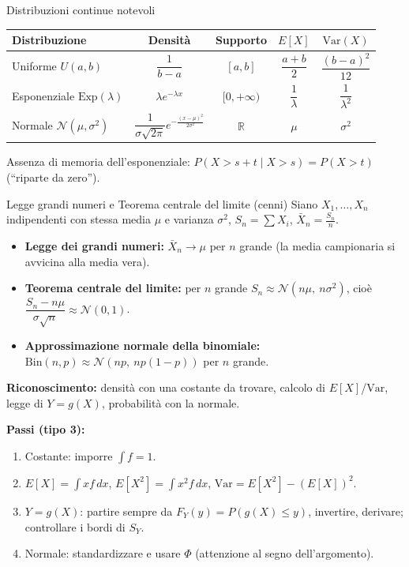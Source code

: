 \documentclass[11pt]{article}
\begin{document}
\begin{concetto}[barGreen]{Distribuzioni continue notevoli}
\begin{center}
\begin{tabular}{lcccc}
\hline
Distribuzione & Densit\`a & Supporto & $E[X]$ & $\mathrm{Var}(X)$ \\
\hline
Uniforme $U(a,b)$ & $\dfrac{1}{b-a}$ & $[a,b]$ & $\dfrac{a+b}{2}$ & $\dfrac{(b-a)^2}{12}$ \\[10pt]
Esponenziale $\mathrm{Exp}(\lambda)$ & $\lambda e^{-\lambda x}$ & $[0,+\infty)$ & $\dfrac{1}{\lambda}$ & $\dfrac{1}{\lambda^2}$ \\[10pt]
Normale $\mathcal{N}(\mu,\sigma^2)$ & $\dfrac{1}{\sigma\sqrt{2\pi}}e^{-\frac{(x-\mu)^2}{2\sigma^2}}$ & $\mathbb{R}$ & $\mu$ & $\sigma^2$ \\[6pt]
\hline
\end{tabular}
\end{center}
\end{concetto}

\begin{attenzione}
Assenza di memoria dell'esponenziale: $P(X>s+t \mid X>s) = P(X>t)$ (``riparte da zero'').
\end{attenzione}

\begin{concetto}[barGreen]{Legge grandi numeri e Teorema centrale del limite (cenni)}
Siano $X_1,\dots,X_n$ indipendenti con stessa media $\mu$ e varianza $\sigma^2$, $S_n=\sum X_i$, $\bar X_n=\frac{S_n}{n}$.
\begin{itemize}[leftmargin=1.2em,itemsep=2pt,topsep=2pt]
\item \textbf{Legge dei grandi numeri:} $\bar X_n \to \mu$ per $n$ grande (la media campionaria si avvicina alla media vera).
\item \textbf{Teorema centrale del limite:} per $n$ grande $S_n \approx \mathcal{N}(n\mu,\ n\sigma^2)$, cio\`e $\dfrac{S_n-n\mu}{\sigma\sqrt{n}} \approx \mathcal{N}(0,1)$.
\item \textbf{Approssimazione normale della binomiale:} $\mathrm{Bin}(n,p)\approx\mathcal{N}(np,\ np(1-p))$ per $n$ grande.
\end{itemize}
\end{concetto}

\begin{trucco}
\textbf{Riconoscimento:} densit\`a con una costante da trovare, calcolo di $E[X]$/$\mathrm{Var}$, legge di $Y=g(X)$, probabilit\`a con la normale.

\textbf{Passi (tipo 3):}
\begin{enumerate}[leftmargin=1.4em,itemsep=1pt,topsep=2pt]
\item Costante: imporre $\int f = 1$.
\item $E[X]=\int x f\,dx$, $E[X^2]=\int x^2 f\,dx$, $\mathrm{Var}=E[X^2]-(E[X])^2$.
\item $Y=g(X)$: partire sempre da $F_Y(y)=P(g(X)\le y)$, invertire, derivare; controllare i bordi di $S_Y$.
\item Normale: standardizzare e usare $\Phi$ (attenzione al segno dell'argomento).
\end{enumerate}
\end{trucco}
\end{document}
